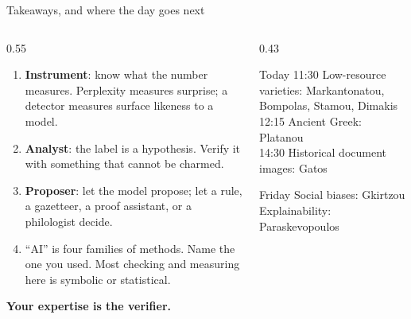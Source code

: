 \documentclass[aspectratio=169, 10pt]{beamer}
\newcommand{\key}[1]{\textcolor{aegean}{\textbf{#1}}}
\newcommand{\hl}[1]{\textcolor{terracotta}{\textbf{#1}}}
\begin{document}
\begin{frame}{Takeaways, and where the day goes next}
  \begin{columns}[T]
    \begin{column}{0.55\textwidth}
      \begin{enumerate}
        \item \key{Instrument}: know what the number measures. Perplexity measures surprise; a detector measures surface likeness to a model.
        \item \key{Analyst}: the label is a hypothesis. Verify it with something that cannot be charmed.
        \item \key{Proposer}: let the model propose; let a rule, a gazetteer, a proof assistant, or a philologist decide.
        \item ``AI'' is four families of methods. Name the one you used. Most checking and measuring here is symbolic or statistical.
      \end{enumerate}
      \vspace{0.5em}
      \Large\centering \hl{Your expertise is the verifier.}
    \end{column}
    \begin{column}{0.43\textwidth}
      \begin{block}{Today}
        11:30 Low-resource varieties: Markantonatou, Bompolas, Stamou, Dimakis\\
        12:15 Ancient Greek: Platanou\\
        14:30 Historical document images: Gatos
      \end{block}
      \begin{block}{Friday}
        Social biases: Gkirtzou\\
        Explainability: Paraskevopoulos
      \end{block}
    \end{column}
  \end{columns}
\end{frame}
\end{document}
